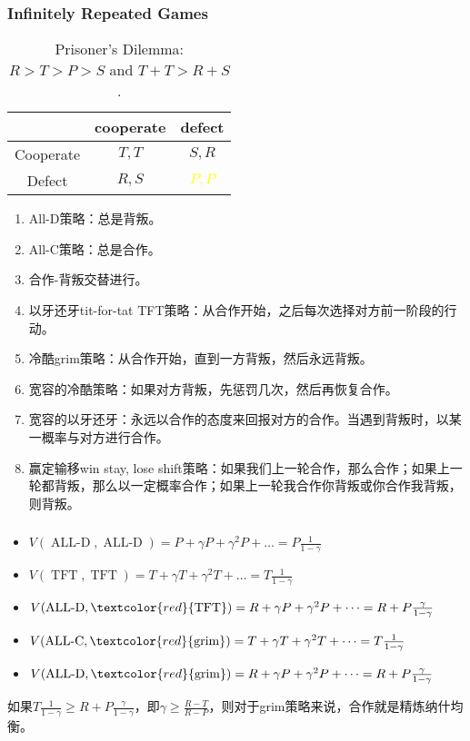 \documentclass[UTF8,11pt,colorlinks,compress,openany]{beamer}%
\begin{document}
\begin{frame}\frametitle{Infinitely Repeated Games}
\begin{table}
\begin{tabu}{c|cc}
\hline
 & cooperate & defect\\
\hline
Cooperate & $T,T$ & $S,R$\\
Defect & $R,S$ &\textcolor{yellow}{$P,P$}\\
\hline
\end{tabu}\caption{Prisoner's Dilemma: $R>T>P>S$ and $T+T > R+S$.}
\end{table}
\begin{enumerate}
	\item All-D策略：总是背叛。
	\item All-C策略：总是合作。
	\item 合作-背叛交替进行。
	\item 以牙还牙tit-for-tat TFT策略：从合作开始，之后每次选择对方前一阶段的行动。
	\item 冷酷grim策略：从合作开始，直到一方背叛，然后永远背叛。
	\item 宽容的冷酷策略：如果对方背叛，先惩罚几次，然后再恢复合作。
	\item 宽容的以牙还牙：永远以合作的态度来回报对方的合作。当遇到背叛时，以某一概率与对方进行合作。
	\item 赢定输移win stay, lose shift策略：如果我们上一轮合作，那么合作；如果上一轮都背叛，那么以一定概率合作；如果上一轮我合作你背叛或你合作我背叛，则背叛。
\end{enumerate}
\end{frame}

\begin{frame}\frametitle{}
\begin{itemize}
	\item $V(\operatorname{ALL-D},\operatorname{ALL-D})=P+\gamma P+\gamma^2 P+\dots=P\frac{1}{1-\gamma}$
	\item $V(\operatorname{TFT},\operatorname{TFT})=T+\gamma T+\gamma^2 T+\dots=T\frac{1}{1-\gamma}$
	\item $V(\operatorname{ALL-D},\textcolor{red}{\operatorname{TFT}})=R+\gamma P+\gamma^2 P+\dots=R+P\frac{\gamma}{1-\gamma}$
	\item $V(\operatorname{ALL-C},\textcolor{red}{\operatorname{grim}})=T+\gamma T+\gamma^2 T+\dots=T\frac{1}{1-\gamma}$
	\item $V(\operatorname{ALL-D},\textcolor{red}{\operatorname{grim}})=R+\gamma P+\gamma^2 P+\dots=R+P\frac{\gamma}{1-\gamma}$
\end{itemize}
如果$T\frac{1}{1-\gamma}\geq R+P\frac{\gamma}{1-\gamma}$，即$\gamma\geq\frac{R-T}{R-P}$，则对于grim策略来说，合作就是精炼纳什均衡。
\end{frame}
\end{document}
